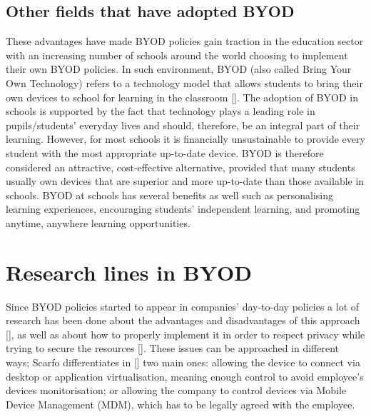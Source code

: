 \subsection{Other fields that have adopted BYOD}
\label{subsec:byodother}

These advantages have made BYOD policies gain traction in the education sector with an increasing number of schools around the world choosing to implement their own BYOD policies. In such environment, BYOD (also called Bring Your Own Technology) refers to a technology model that allows students to bring their own devices to school for learning in the classroom [\cite{sangani2013byod, song2014bring}]. The adoption of BYOD in schools is supported by the fact that technology plays a leading role in
pupils/students' everyday lives and should, therefore, be an integral part of their learning. However, for most schools it is financially unsustainable to provide every student with the most appropriate up-to-date device. BYOD is therefore considered an attractive, cost-effective alternative, provided that many students usually own
devices that are superior and more up-to-date than those available in schools. BYOD at schools has several benefits as well such as personalising learning experiences, encouraging students' independent learning, and promoting anytime, anywhere learning opportunities.

\section{Research lines in BYOD}

Since BYOD policies started to appear in companies' day-to-day policies a lot of research has been done about the advantages and disadvantages of this approach [\cite{singh2012byod}], as well as about how to properly implement it in order to respect privacy while trying to secure the resources [\cite{scarfo2012new, ali2015analysis, de2015corporate}]. These issues can be approached in different ways; Scarfo differentiates in [\cite{scarfo2012new}] two main ones: allowing the device to connect via desktop or application virtualisation, meaning enough control to avoid employee's devices monitorisation; or allowing the company to control devices via Mobile Device Management (MDM), which has to be legally agreed with the employee.

